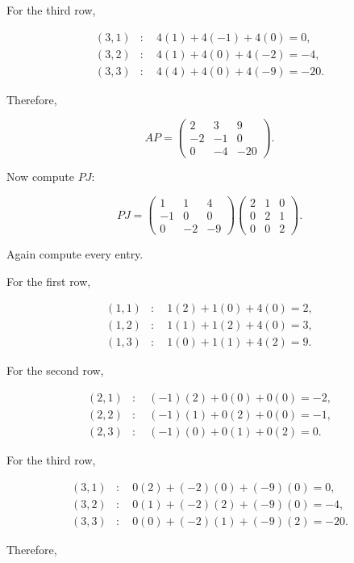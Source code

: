 \documentclass[11pt]{article}
\begin{document}
For the third row,

\[
\begin{aligned}
(3,1)&:\quad 4(1)+4(-1)+4(0)=0,\\
(3,2)&:\quad 4(1)+4(0)+4(-2)=-4,\\
(3,3)&:\quad 4(4)+4(0)+4(-9)=-20.
\end{aligned}
\]

Therefore,

\[
\boxed{
AP=
\begin{pmatrix}
2&3&9\\
-2&-1&0\\
0&-4&-20
\end{pmatrix}.
}
\]

Now compute \(PJ\):

\[
PJ
=
\begin{pmatrix}
1&1&4\\
-1&0&0\\
0&-2&-9
\end{pmatrix}
\begin{pmatrix}
2&1&0\\
0&2&1\\
0&0&2
\end{pmatrix}.
\]

Again compute every entry.

For the first row,

\[
\begin{aligned}
(1,1)&:\quad 1(2)+1(0)+4(0)=2,\\
(1,2)&:\quad 1(1)+1(2)+4(0)=3,\\
(1,3)&:\quad 1(0)+1(1)+4(2)=9.
\end{aligned}
\]

For the second row,

\[
\begin{aligned}
(2,1)&:\quad (-1)(2)+0(0)+0(0)=-2,\\
(2,2)&:\quad (-1)(1)+0(2)+0(0)=-1,\\
(2,3)&:\quad (-1)(0)+0(1)+0(2)=0.
\end{aligned}
\]

For the third row,

\[
\begin{aligned}
(3,1)&:\quad 0(2)+(-2)(0)+(-9)(0)=0,\\
(3,2)&:\quad 0(1)+(-2)(2)+(-9)(0)=-4,\\
(3,3)&:\quad 0(0)+(-2)(1)+(-9)(2)=-20.
\end{aligned}
\]

Therefore,
\end{document}
